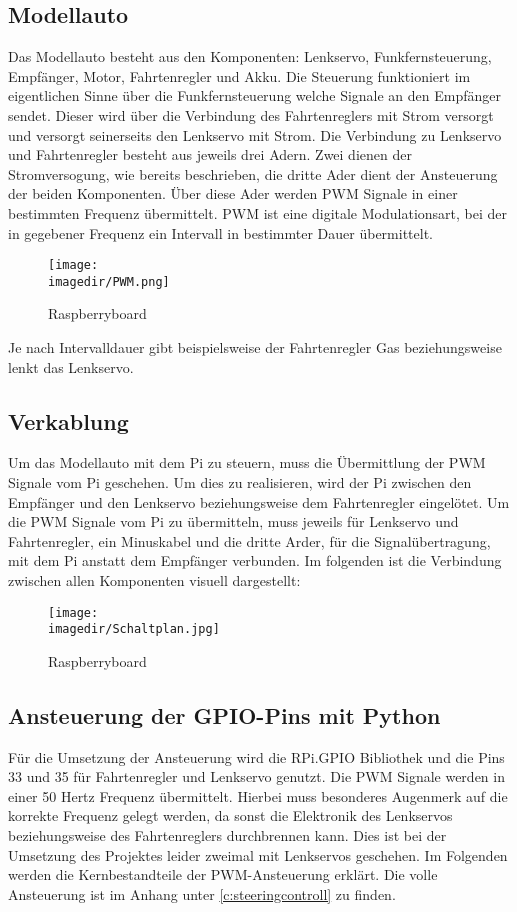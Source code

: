 \subsection{Modellauto}
Das Modellauto besteht aus den Komponenten: Lenkservo, Funkfernsteuerung, Empfänger, Motor, Fahrtenregler und Akku. Die Steuerung funktioniert im eigentlichen Sinne über die Funkfernsteuerung welche Signale an den Empfänger sendet. Dieser wird über die Verbindung des Fahrtenreglers mit Strom versorgt und versorgt seinerseits den Lenkservo mit Strom. Die Verbindung zu Lenkservo und Fahrtenregler besteht aus jeweils drei Adern. Zwei dienen der Stromversogung, wie bereits beschrieben, die dritte Ader dient der Ansteuerung der beiden Komponenten. Über diese Ader werden \ac{PWM} Signale in einer bestimmten Frequenz übermittelt. \ac{PWM} ist eine digitale Modulationsart, bei der in gegebener Frequenz ein Intervall in bestimmter Dauer übermittelt.

\begin{figure}[H]
\centering
\texttt{[image: \\imagedir/PWM.png]}
\caption{Raspberryboard \autocite[VglRaspberrboard]{https://www.raspberrypi.org/documentation/usage/gpio}} 
\end{figure}

Je nach Intervalldauer gibt beispielsweise der Fahrtenregler Gas beziehungsweise lenkt das Lenkservo.

\subsection{Verkablung}
Um das Modellauto mit dem \ac{Pi} zu steuern, muss die Übermittlung der \ac{PWM} Signale vom \ac{Pi} geschehen. Um dies zu realisieren, wird der \ac{Pi} zwischen den Empfänger und den Lenkservo beziehungsweise dem Fahrtenregler eingelötet. Um die \ac{PWM} Signale vom \ac{Pi} zu übermitteln, muss jeweils für Lenkservo und Fahrtenregler, ein Minuskabel und die dritte Arder, für die Signalübertragung, mit dem \ac{Pi} anstatt dem Empfänger verbunden. Im folgenden ist die Verbindung zwischen allen Komponenten visuell dargestellt:
\begin{figure}[H]
\centering
\texttt{[image: \\imagedir/Schaltplan.jpg]}
\caption{Raspberryboard\autocite[Vgl https://www.raspberrypi.org/documentation/usage/gpio]{}} 
\end{figure}

\subsection{Ansteuerung der \ac{GPIO}-Pins mit Python}\label{ss:Ansteuerung}
Für die Umsetzung der Ansteuerung wird die RPi.GPIO Bibliothek und die Pins 33 und 35 für Fahrtenregler und Lenkservo genutzt. Die \ac{PWM} Signale werden in einer 50 Hertz Frequenz übermittelt. Hierbei muss besonderes Augenmerk auf die korrekte Frequenz gelegt werden, da sonst die Elektronik des Lenkservos beziehungsweise des Fahrtenreglers durchbrennen kann. Dies ist bei der Umsetzung des Projektes leider zweimal mit Lenkservos geschehen. Im Folgenden werden die Kernbestandteile der \ac{PWM}-Ansteuerung erklärt. Die volle Ansteuerung ist im Anhang unter \ref{c:steeringcontroll} zu finden.

